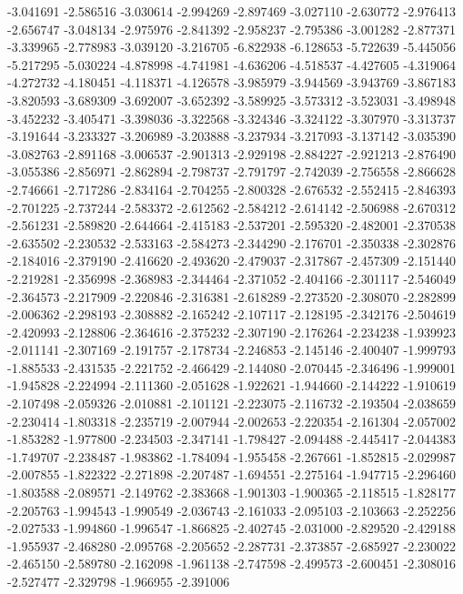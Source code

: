 -3.041691
-2.586516
-3.030614
-2.994269
-2.897469
-3.027110
-2.630772
-2.976413
-2.656747
-3.048134
-2.975976
-2.841392
-2.958237
-2.795386
-3.001282
-2.877371
-3.339965
-2.778983
-3.039120
-3.216705
-6.822938
-6.128653
-5.722639
-5.445056
-5.217295
-5.030224
-4.878998
-4.741981
-4.636206
-4.518537
-4.427605
-4.319064
-4.272732
-4.180451
-4.118371
-4.126578
-3.985979
-3.944569
-3.943769
-3.867183
-3.820593
-3.689309
-3.692007
-3.652392
-3.589925
-3.573312
-3.523031
-3.498948
-3.452232
-3.405471
-3.398036
-3.322568
-3.324346
-3.324122
-3.307970
-3.313737
-3.191644
-3.233327
-3.206989
-3.203888
-3.237934
-3.217093
-3.137142
-3.035390
-3.082763
-2.891168
-3.006537
-2.901313
-2.929198
-2.884227
-2.921213
-2.876490
-3.055386
-2.856971
-2.862894
-2.798737
-2.791797
-2.742039
-2.756558
-2.866628
-2.746661
-2.717286
-2.834164
-2.704255
-2.800328
-2.676532
-2.552415
-2.846393
-2.701225
-2.737244
-2.583372
-2.612562
-2.584212
-2.614142
-2.506988
-2.670312
-2.561231
-2.589820
-2.644664
-2.415183
-2.537201
-2.595320
-2.482001
-2.370538
-2.635502
-2.230532
-2.533163
-2.584273
-2.344290
-2.176701
-2.350338
-2.302876
-2.184016
-2.379190
-2.416620
-2.493620
-2.479037
-2.317867
-2.457309
-2.151440
-2.219281
-2.356998
-2.368983
-2.344464
-2.371052
-2.404166
-2.301117
-2.546049
-2.364573
-2.217909
-2.220846
-2.316381
-2.618289
-2.273520
-2.308070
-2.282899
-2.006362
-2.298193
-2.308882
-2.165242
-2.107117
-2.128195
-2.342176
-2.504619
-2.420993
-2.128806
-2.364616
-2.375232
-2.307190
-2.176264
-2.234238
-1.939923
-2.011141
-2.307169
-2.191757
-2.178734
-2.246853
-2.145146
-2.400407
-1.999793
-1.885533
-2.431535
-2.221752
-2.466429
-2.144080
-2.070445
-2.346496
-1.999001
-1.945828
-2.224994
-2.111360
-2.051628
-1.922621
-1.944660
-2.144222
-1.910619
-2.107498
-2.059326
-2.010881
-2.101121
-2.223075
-2.116732
-2.193504
-2.038659
-2.230414
-1.803318
-2.235719
-2.007944
-2.002653
-2.220354
-2.161304
-2.057002
-1.853282
-1.977800
-2.234503
-2.347141
-1.798427
-2.094488
-2.445417
-2.044383
-1.749707
-2.238487
-1.983862
-1.784094
-1.955458
-2.267661
-1.852815
-2.029987
-2.007855
-1.822322
-2.271898
-2.207487
-1.694551
-2.275164
-1.947715
-2.296460
-1.803588
-2.089571
-2.149762
-2.383668
-1.901303
-1.900365
-2.118515
-1.828177
-2.205763
-1.994543
-1.990549
-2.036743
-2.161033
-2.095103
-2.103663
-2.252256
-2.027533
-1.994860
-1.996547
-1.866825
-2.402745
-2.031000
-2.829520
-2.429188
-1.955937
-2.468280
-2.095768
-2.205652
-2.287731
-2.373857
-2.685927
-2.230022
-2.465150
-2.589780
-2.162098
-1.961138
-2.747598
-2.499573
-2.600451
-2.308016
-2.527477
-2.329798
-1.966955
-2.391006
